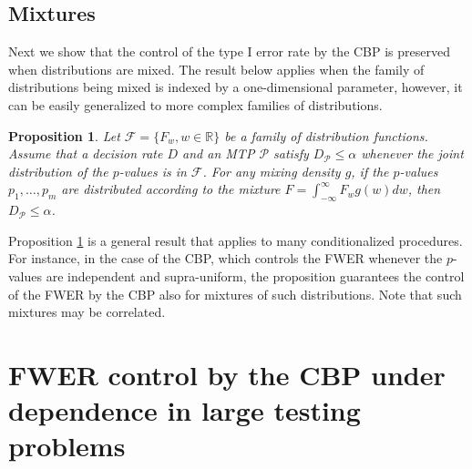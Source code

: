 \documentclass {imsart}
\newtheorem{Proposition}{Proposition}
\renewcommand{\emph}[1]{\textsl{#1}}
\newcommand{\FWERcb}{\mathrm{FWER}_{\mathrm{CBP}}^{\lambda,\alpha}}
\renewcommand{\P}{\mathcal{P}}
\newcommand{\R}{\mathbb{R}}                 %
\begin{document}
\subsection{Mixtures}


 Next we show that the control of the type I error rate by the CBP is preserved when distributions are mixed. The result below applies when the family of distributions being mixed is indexed by a one-dimensional parameter, however, it can be easily generalized to more complex families of distributions.

\begin{Proposition}
\label{lem:mixtures}
 Let $\mathcal{F}=\{F_w,w\in\R\}$ be a family of distribution functions. Assume that a decision rate $D$ and an MTP $\P$ satisfy $D_{\P} \leq\alpha$ whenever the joint distribution of the $p$-values is in $\mathcal{F}$. For any mixing density $g$, if the $p$-values $p_1,\ldots,p_m$ are distributed according to the mixture $F=\int_{-\infty}^\infty{}F_w g(w)dw$, then $D_{\P} \leq\alpha$.
\end{Proposition}


 Proposition \ref{lem:mixtures} is a general result that applies to many conditionalized procedures. For instance, in the case of the CBP, which controls the FWER whenever the $p$-values are independent and supra-uniform, the proposition guarantees the control of the FWER by the CBP also for mixtures of such distributions. Note that such mixtures may be correlated.



\section{FWER control by the CBP under dependence in large testing problems}
\end{document}
